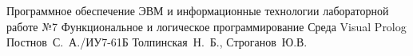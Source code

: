 \documentclass{bmstu}
\begin{document}
	
	{Программное обеспечение ЭВМ и информационные технологии}
	{лабораторной работе №7}
	{Функциональное и логическое программирование}
	{Среда Visual Prolog}
	{}
	{Постнов~С.~А./ИУ7-61Б}
	{Толпинская~Н.~Б., Строганов~Ю.В.}
	
	\maketableofcontents
	
	
	
\end{document}
